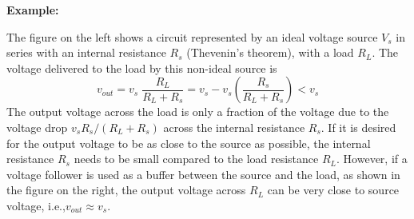 \begin{itemize}
\begin{comment}
      \begin{itemize}
      \item The open-circuit voltage $v_{oc}$ (with $R_L=\infty$ and $i_{out}=0$) 
        can be found by applying KVL to the loop:
        \[ 
        v_s=(R_s+r_{in}+r_{out})i_{in}+Ar_{in}i_{in},\;\;\;\mbox{i.e.,}\;\;\;\;
        i_{in}=\frac{v_s}{R_s+(A+1)r_{in}+r_{out}}      
        \]
        The voltage across the output port is
        \[ 
        v_{oc}=Ar_{in}i_{in}+r_{out}i_{in}
        =v_s\frac{Ar_{in}+r_{out}}{R_s+(A+1)r_{in}+r_{out}} 
        \]
      \item The short-circuit current $i_{sc}=i_{out}$ ($R_L=0$) can be found
        by applying KVL to the two loops:
        \[ 
        \left\{ \begin{array}{l}
          v_s=(R_s+r_{out}+(A+1)r_{in})i_{in}-r_{out} i_{out} \\
          Ar_{in}i_{in}=r_{out} i_{out}-r_{out} i_{in} \right. \end{array} 
        \]
        Solving these two equation for the two loop currents we get:
        \[ 
        i_{in}=\frac{v_s}{R_s+r_{in}},\;\;\;\;\;\;\;
        i_{out}=i_{sc}=v_s\frac{Ar_{in}+r_{out}}{r_{out}(R_s+r_{in})} 
        \]
      \item Find the output resistance:
        \[ 
        R_{out}=\frac{v_{oc}}{i_{sc}}
        =\frac{r_{out}(R_s+r_{in})}{R_s+(A+1)r_{in}+r_{out}} 
        \]
        Note that $R_{out}$ is affected by the internal resistance $R_s$ of the
        source. As $R_s+r_{out}<<(A+1)r_{in}$ and $R_s<<r_{in}$, we have
        \[ 
        R_{out}\approx \frac{r_{out}}{A} 
        \]
      \end{itemize}

  \end{itemize}


  \end{comment}

  {\bf Example:} 


  The figure on the left shows a circuit represented by an ideal voltage
  source $V_s$ in series with an internal resistance $R_s$ (Thevenin's
  theorem), with a load $R_L$. The voltage delivered to the load by this
  non-ideal source is
  \[
  v_{out}=v_s \;\frac{R_L}{R_L+R_s} =v_s - v_s\left(\frac{R_s}{R_L+R_s} \right)<v_s
  \]
  The output voltage across the load is only a fraction of the voltage due
  to the voltage drop $v_s R_s/(R_L+R_s)$ across the internal resistance $R_s$.
  If it is desired for the output voltage to be as close to the source as 
  possible, the internal resistance $R_s$ needs to be small compared to the
  load resistance $R_L$. However, if a voltage follower is used as a buffer
  between the source and the load, as shown in the figure on the right,
  the output voltage across $R_L$ can be very close to source voltage,
  i.e.,$v_{out}\approx v_s$.


\end{itemize}
